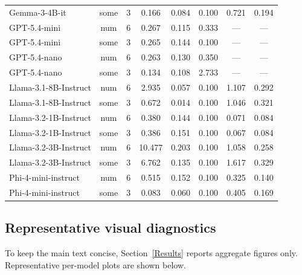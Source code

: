 \documentclass[11pt]{article}
\begin{document}
\begin{table}[t]
\begin{tabular}{@{}p{2.6cm}ccccccc@{}}
  Gemma-3-4B-it & some & 3 & 0.166 & 0.084 & 0.100 & 0.721 & 0.194 \\

  GPT-5.4-mini & num & 6 & 0.267 & 0.115 & 0.333 & --- & --- \\

  GPT-5.4-mini & some & 3 & 0.265 & 0.144 & 0.100 & --- & --- \\

  GPT-5.4-nano & num & 6 & 0.263 & 0.130 & 0.350 & --- & --- \\

  GPT-5.4-nano & some & 3 & 0.134 & 0.108 & 2.733 & --- & --- \\

  Llama-3.1-8B-Instruct & num & 6 & 2.935 & 0.057 & 0.100 & 1.107 & 0.292 \\

  Llama-3.1-8B-Instruct & some & 3 & 0.672 & 0.014 & 0.100 & 1.046 & 0.321 \\

  Llama-3.2-1B-Instruct & num & 6 & 0.380 & 0.144 & 0.100 & 0.071 & 0.084 \\

  Llama-3.2-1B-Instruct & some & 3 & 0.386 & 0.151 & 0.100 & 0.067 & 0.084 \\

  Llama-3.2-3B-Instruct & num & 6 & 10.477 & 0.203 & 0.100 & 1.058 & 0.258 \\

  Llama-3.2-3B-Instruct & some & 3 & 6.762 & 0.135 & 0.100 & 1.617 & 0.329 \\

  Phi-4-mini-instruct & num & 6 & 0.515 & 0.152 & 0.100 & 0.325 & 0.140 \\

  Phi-4-mini-instruct & some & 3 & 0.083 & 0.060 & 0.100 & 0.405 & 0.169 \\

  \bottomrule

  \end{tabular}

\end{table}

\subsection{Representative visual diagnostics}

To keep the main text concise, Section~\ref{Results} reports aggregate figures only. Representative per-model plots are shown below.
\end{document}
